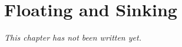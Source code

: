 \chapter{Floating and Sinking}\label{ch:g1:floating-and-sinking}


\emph{This chapter has not been written yet.}
